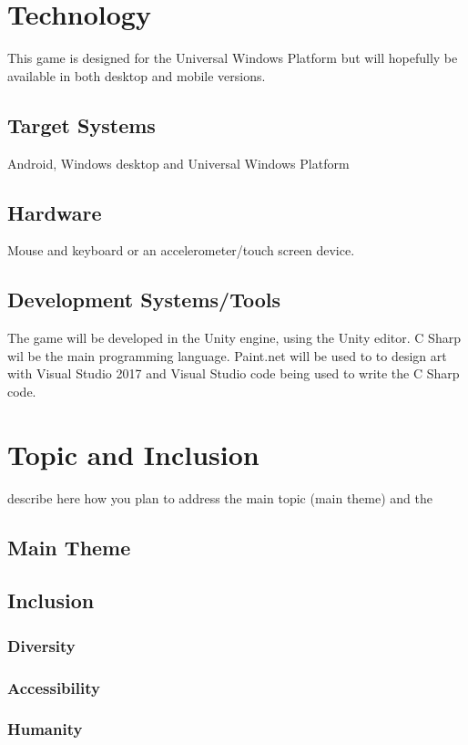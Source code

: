 \documentclass[a4paper]{scrreprt}
\begin{document}
\chapter{Technology}
This game is designed for the Universal Windows Platform but will hopefully be available in both desktop and mobile versions.

\section{Target Systems}
Android, Windows desktop and Universal Windows Platform

\section{Hardware}
Mouse and keyboard or an accelerometer/touch screen device.

\section{Development Systems/Tools}
The game will be developed in the Unity engine, using the Unity editor. C Sharp wil be the main programming language. Paint.net will be used to to design art with Visual Studio 2017 and Visual Studio code being used to write the C Sharp code.


\chapter{Topic and Inclusion }

describe here how you plan to address the main topic (main theme) and the 

\section{Main Theme}
\section{Inclusion}

\subsection{Diversity}
\subsection{Accessibility}
\subsection{Humanity}
\end{document}
